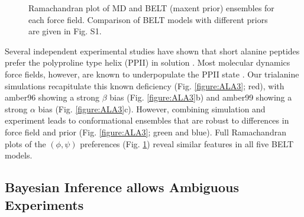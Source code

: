 \documentclass[11pt,titlepage]{article}
\begin{document}
\begin{figure}

\caption{
Ramachandran plot of MD and BELT (maxent prior) ensembles for each force field.  Comparison of BELT models with different priors are given in Fig. S1.  
}
\label{figure:Rama}
\end{figure}

Several independent experimental studies have shown that short alanine peptides prefer the polyproline type helix (PPII) in solution \citep{Grdadolnik2011, Graf2007, Avbelj2006}.  Most molecular dynamics force fields, however, are known to underpopulate the PPII state \citep{Graf2007,beauchamp2012protein,Nerenberg2011, Best2008}.  Our trialanine simulations recapitulate this known deficiency (Fig. \ref{figure:ALA3}; red), with amber96 showing a strong $\beta$ bias (Fig. \ref{figure:ALA3}b) and amber99 showing a strong $\alpha$ bias (Fig. \ref{figure:ALA3}c).  However, combining simulation and experiment leads to conformational ensembles that are robust to differences in force field and prior (Fig. \ref{figure:ALA3}; green and blue).  Full Ramachandran plots of the $(\phi, \psi)$ preferences (Fig. \ref{figure:Rama}) reveal similar features in all five BELT models.  

\subsection*{Bayesian Inference allows Ambiguous Experiments}
\end{document}

